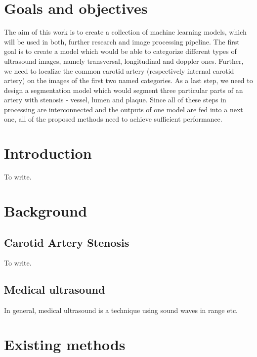 

\chapter{Goals and objectives}
The aim of this work is to create a collection of machine learning models, which
will be used in both, further research and image processing pipeline. The first
goal is to create a model which would be able to categorize different types of
ultrasound images, namely transversal, longitudinal and doppler ones. Further, 
we need to localize the common carotid artery (respectively internal carotid artery)
on the images of the first two named categories. As a last step, we need to
design a segmentation model which would segment three particular parts of
an artery with stenosis - vessel, lumen and plaque. Since all of these steps
in processing are interconnected and the outputs of one model are fed into a 
next one, all of the proposed methods need to achieve sufficient performance.


\chapter{Introduction}
To write.




\chapter{Background}

\section{Carotid Artery Stenosis}
To write.

\section{Medical ultrasound}
In general, medical ultrasound is a technique using sound waves in range etc.



\chapter{Existing methods}

